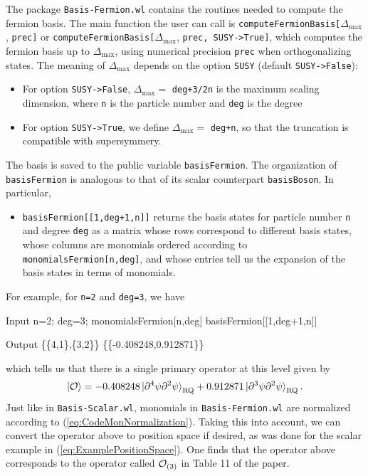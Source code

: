 \documentclass[12pt]{article}
\newcommand{\CO}{{\cal O}}
\newcommand\De\Delta
\newcommand{\p}{\partial}
\newcommand{\Dmax}{\De_{\max}}
\newcommand{\rket}[1]{\ket{#1}_{\rm RQ}}
\begin{document}
The package  {\tt Basis-Fermion.wl} contains the routines needed to compute the fermion basis. The main function the user can call is {\tt computeFermionBasis[}$\Delta_{\textrm{max} } $, {\tt prec]} or {\tt computeFermionBasis[}$\Delta_{\textrm{max} } $, {\tt prec, SUSY->True]}, which computes the fermion basis up to $\Dmax$, using numerical precision {\tt prec} when orthogonalizing states. The meaning of $\Dmax$ depends on the option {\tt SUSY} (default {\tt SUSY->False}):
\begin{itemize}
\item For option {\tt SUSY->False}, $\Dmax =$ {\tt deg+3/2n} is  the maximum scaling dimension, where {\tt n} is the particle number and {\tt deg} is the degree  
\item For option {\tt SUSY->True}, we define $\Dmax=$ {\tt deg+n}, so that the truncation is compatible with supersymmery.
\end{itemize}
The basis is saved to the public variable {\tt basisFermion}.  The organization of {\tt basisFermion} is analogous to that of its scalar counterpart {\tt basisBoson}. In particular,
\begin{itemize}
\item {\tt basisFermion[[1,deg+1,n]]} returns the basis states for particle number {\tt n} and degree {\tt deg} as a matrix whose rows correspond to different basis states, whose columns are monomials ordered according to {\tt monomialsFermion[n,deg]}, and whose entries tell us the expansion of the basis states in terms of monomials. 
\end{itemize}
For example, for {\tt n=2} and {\tt deg=3}, we have 
\begin{mmaCell}[moredefined={monomialsFermion,basisFermion}]{Input}
  n=2; deg=3; 
  monomialsFermion[n,deg]
  basisFermion[[1,deg+1,n]]
\end{mmaCell}
\begin{mmaCell}{Output}
  \{\{4,1\},\{3,2\}\}
  \{\{-0.408248,0.912871\}\}
\end{mmaCell}
which tells us that there is a single primary operator at this level given by 
\begin{equation*}
\ket{\CO} = -0.408248 \rket{ \p^4 \psi \p^2\psi } + 0.912871 \rket{ \p^3 \psi \p^2 \psi  }. 
\end{equation*}
Just like in {\tt Basis-Scalar.wl}, monomials in {\tt Basis-Fermion.wl} are normalized according to (\ref{eq:CodeMonNormalization}). Taking this into account, we can convert the operator above to position space if desired, as was done for the scalar example in (\ref{eq:ExamplePositionSpace}). One finds that the operator above corresponds to the operator called $\CO_{(3)}$ in Table 11 of the paper. 
\end{document}
